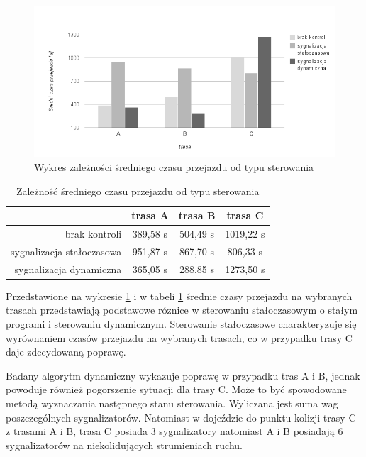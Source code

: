 \FloatBarrier
\begin{figure}[h]
    \centering
    \includegraphics[width=1.0\textwidth]{images/wykres_typ_sterowania_czas.png}
    \caption{Wykres zależności średniego czasu przejazdu od typu sterowania}
    \label{fig:wykres_typ_sterowania_czas}
\end{figure}
\FloatBarrier
\begin{table}[h]
	\centering
	\begin{tabular}{ |r|c|c|c| }
		\hline
		& trasa A & trasa B & trasa C \\
		\hline
		brak kontroli & 389,58 s & 504,49 s & 1019,22 s \\
		\hline
		sygnalizacja stałoczasowa & 951,87 s & 867,70 s & 806,33 s \\
		\hline
		sygnalizacja dynamiczna & 365,05 s & 288,85 s & 1273,50 s \\
		\hline
	\end{tabular}
	\caption{Zależność średniego czasu przejazdu od typu sterowania}
	\label{tab:wykres_typ_sterowania_czas}
\end{table}
\FloatBarrier
Przedstawione na wykresie \ref{fig:wykres_typ_sterowania_czas} i w tabeli \ref{tab:wykres_typ_sterowania_czas} średnie czasy przejazdu na wybranych trasach przedstawiają podstawowe róznice w sterowaniu stałoczasowym o stałym programi i sterowaniu dynamicznym. Sterowanie stałoczasowe charakteryzuje się wyrównaniem czasów przejazdu na wybranych trasach, co w przypadku trasy C daje zdecydowaną poprawę.

Badany algorytm dynamiczny wykazuje poprawę w przypadku tras A i B, jednak powoduje również pogorszenie sytuacji dla trasy C. Może to być spowodowane metodą wyznaczania następnego stanu sterowania. Wyliczana jest suma wag poszczególnych sygnalizatorów. Natomiast w dojeździe do punktu kolizji trasy C z trasami A i B, trasa C posiada 3 sygnalizatory natomiast A i B posiadają 6 sygnalizatorów na niekolidujących strumieniach ruchu.

